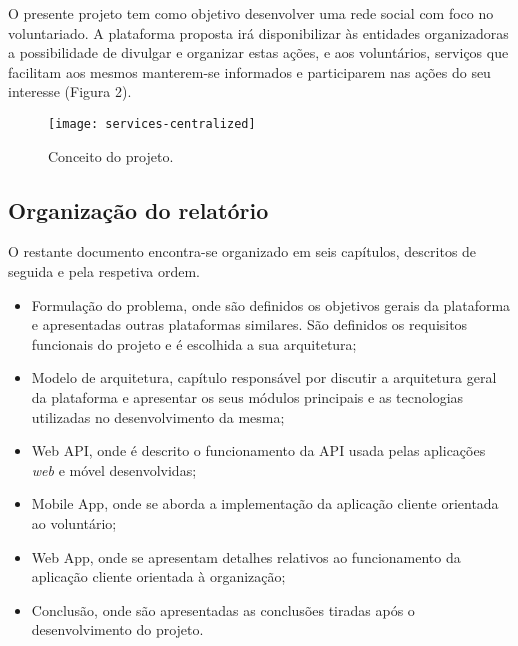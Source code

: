 \newpage

O presente projeto tem como objetivo desenvolver uma rede social com foco no voluntariado. A plataforma proposta irá disponibilizar às entidades organizadoras a possibilidade de divulgar e organizar estas ações, e aos voluntários, serviços que facilitam aos mesmos manterem-se informados e participarem nas ações do seu interesse (Figura 2).

\bigskip \bigskip \bigskip

\begin{figure}[h]
	\centering
	\texttt{[image: services-centralized]}
	\caption{Conceito do projeto.}
\end{figure}

\subsection{Organização do relatório}

O restante documento encontra-se organizado em seis capítulos, descritos de seguida e pela respetiva ordem.
\begin{itemize}
	\item Formulação do problema, onde são definidos os objetivos gerais da plataforma e apresentadas outras plataformas similares. São definidos os requisitos funcionais do projeto e é escolhida a sua arquitetura;
	\item Modelo de arquitetura, capítulo responsável por discutir a arquitetura geral da plataforma e apresentar os seus módulos principais e as tecnologias utilizadas no desenvolvimento da mesma;
	\item Web API, onde é descrito o funcionamento da API usada pelas aplicações \textit{web} e móvel desenvolvidas;
	\item Mobile App, onde se aborda a implementação da aplicação cliente orientada ao voluntário;
	\item Web App, onde se apresentam detalhes relativos ao funcionamento da aplicação cliente orientada à organização;
	\item Conclusão, onde são apresentadas as conclusões tiradas após o desenvolvimento do projeto.
\end{itemize}
























